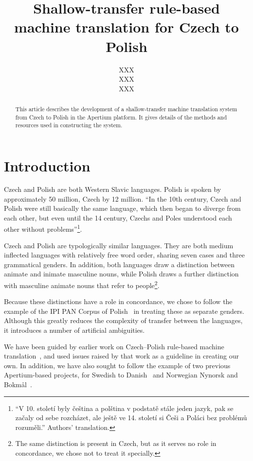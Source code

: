 \documentclass[11pt]{article}
\title{Shallow-transfer rule-based machine translation for Czech to Polish}
\author{XXX\\
  XXX \\
  XXX \\
}
\date{}
\begin{document}
\maketitle

\begin{abstract}
This article describes the development of a shallow-transfer machine translation
system from Czech to Polish in the Apertium platform. It gives details of the
methods and resources used in constructing the system. 
\end{abstract}

\section{Introduction}

Czech and Polish are both Western Slavic languages. Polish is spoken by
approximately 50 million, Czech by 12 million.
``In the 10th century, Czech and Polish were still basically the same language, 
which then began to diverge from each other, but even until the 14 century, 
Czechs and Poles understood each other without problems''\footnote{``V 10. 
století byly čeština a polština v podstatě stále jeden jazyk, pak se začaly 
od sebe rozcházet, ale ještě ve 14. století si Češi a Poláci bez problémů rozuměli.''
Authors' translation.}.~\citep{wiki:polstina}

Czech and Polish are typologically similar languages. They are both medium inflected 
languages with relatively free word order, sharing seven cases and three grammatical 
genders. In addition, both languages draw a distinction between animate and inimate 
masculine nouns, while Polish draws a further distinction with masculine animate 
nouns that refer to people\footnote{The same distinction is present in Czech, but
as it serves no role in concordance, we chose not to treat it specially.}.

Because these distinctions have a role in concordance, we chose to 
follow the example of the IPI PAN Corpus of Polish~\citep{prze:04ce} in treating these 
as separate genders. Although this greatly reduces the complexity of transfer between 
the languages, it introduces a number of artificial ambiguities.

We have been guided by earlier work on Czech--Polish rule-based machine translation~\citep{Debowski02}, 
and used issues raised by that work as a guideline in creating our own. In addition, we 
have also sought to follow the example of two previous Apertium-based projects, for Swedish to 
Danish~\citep{tyers2009rfr} and Norwegian Nynorsk and Bokm{\aa}l~\citep{unhammer2009rfr}.
\end{document}
